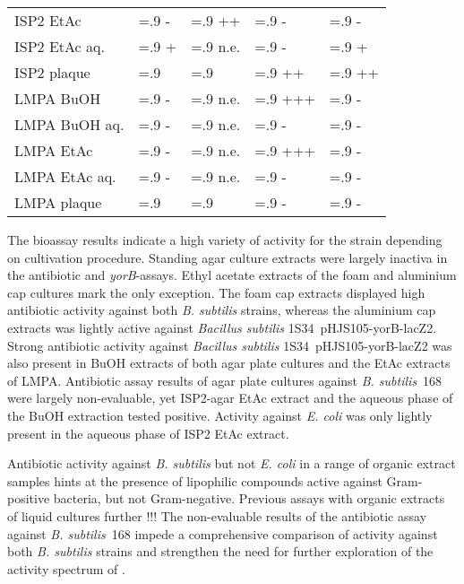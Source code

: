 \begin{table}[htbp]
\begin{tabularx}{\textwidth}{>{\hsize=1.4\hsize}X>{\hsize=.9\hsize}X>{\hsize=.9\hsize}X>{\hsize=.9\hsize}X>{\hsize=.9\hsize}X}
        ISP2 EtAc       & -     & ++    & -     & -    \\
        ISP2 EtAc aq.   & +     & n.e.  & -     & +    \\
        ISP2 plaque     &       &       & ++    & ++   \\
        \midrule
        LMPA BuOH       & -     & n.e.  & +++   & -    \\
        LMPA BuOH aq.   & -     & n.e.  & -     & -    \\
        LMPA EtAc       & -     & n.e.  & +++   & -    \\
        LMPA EtAc aq.   & -     & n.e.  & -     & -    \\
        LMPA plaque     &       &       & -     & -    \\
        \bottomrule
    \end{tabularx}
\end{table}

The bioassay results indicate a high variety of activity for the strain \tue{} depending on cultivation procedure.
Standing agar culture extracts were largely inactiva in the antibiotic and \emph{yorB}-assays.
Ethyl acetate extracts of the foam and aluminium cap cultures mark the only exception.
The foam cap extracts displayed high antibiotic activity against both \emph{B. subtilis} strains, whereas the aluminium cap extracts was lightly active against \textit{Bacillus subtilis} 1S34~pHJS105-yorB-lacZ2.
Strong antibiotic activity against \textit{Bacillus subtilis} 1S34~pHJS105-yorB-lacZ2 was also present in BuOH extracts of both agar plate cultures and the EtAc extracts of LMPA. 
Antibiotic assay results of agar plate cultures against \emph{B. subtilis}~168 were largely non-evaluable, yet ISP2-agar EtAc extract and the aqueous phase of the BuOH extraction tested positive.
Activity against \emph{E. coli} was only lightly present in the aqueous phase of ISP2 EtAc extract.

Antibiotic activity against \emph{B. subtilis} but not \emph{E. coli} in a range of organic extract samples hints at the presence of lipophilic compounds active against Gram-positive bacteria, but not Gram-negative.
Previous assays with organic extracts of liquid cultures further !!!
The non-evaluable results of the antibiotic assay against \emph{B. subtilis}~168 impede a comprehensive comparison of activity against both \emph{B. subtilis} strains and strengthen the need for further exploration of the activity spectrum of \tue{}.

